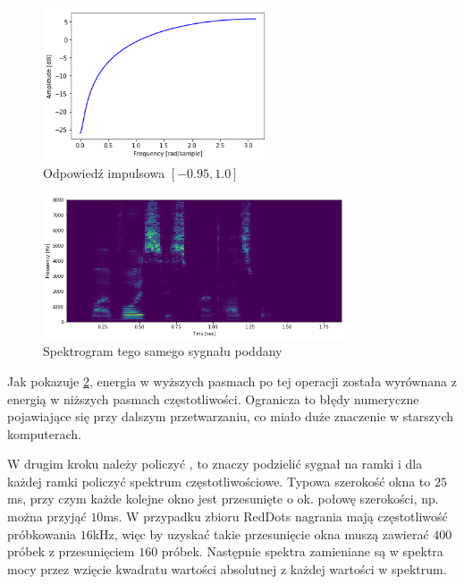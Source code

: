 \begin{figure}[H]
    \centering
    \includegraphics[width=0.6\textwidth]{images/2_1_c_preemphasis_response}
    \caption{Odpowiedź impulsowa  $[-0.95, 1.0]$}
    \label{fig:2_1_c_preemphasis_response}
\end{figure}

\begin{figure}[H]
    \centering
    \includegraphics[width=0.8\textwidth]{images/2_1_b_example_preemphasis}
    \caption{Spektrogram tego samego sygnału poddany }
    \label{fig:2_1_b_example_preemphasis}
\end{figure}

Jak pokazuje \ref{fig:2_1_b_example_preemphasis}, energia w wyższych pasmach po tej operacji
została wyrównana z energią w niższych pasmach częstotliwości. Ogranicza to błędy numeryczne
pojawiające się przy dalszym przetwarzaniu, co miało duże znaczenie w starszych komputerach.

W drugim kroku należy policzyć , to znaczy podzielić
sygnał na ramki i dla każdej ramki policzyć spektrum częstotliwościowe. Typowa szerokość
okna to $25$ms, przy czym każde kolejne okno jest przesunięte o ok. połowę szerokości, 
np. można przyjąć $10$ms. W przypadku zbioru RedDots nagrania mają częstotliwość próbkowania $16$kHz,
więc by uzyskać takie przesunięcie okna muszą zawierać $400$ próbek z przesunięciem $160$ próbek.
Następnie spektra zamieniane są w spektra mocy przez wzięcie kwadratu wartości absolutnej
z każdej wartości w spektrum.

